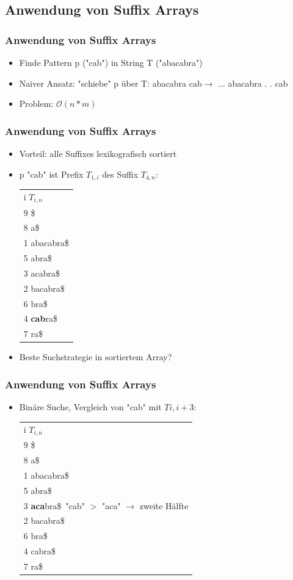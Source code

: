 \documentclass{beamer}
\begin{document}
\subsection{Anwendung von Suffix Arrays}
\begin{frame}
\frametitle{Anwendung von Suffix Arrays}
\begin{itemize}
\item Finde Pattern p ("cab") in String T ("abacabra")
\item Naiver Ansatz: "schiebe" p \"uber T: \newline
abacabra \newline
cab$\rightarrow$ \newline
...\newline
abacabra \newline
. . cab
\item Problem: $\mathcal{O}(n*m)$
\end{itemize}
\end{frame}
\begin{frame}
\frametitle{Anwendung von Suffix Arrays}
\begin{itemize}
\item Vorteil: alle Suffixes lexikografisch sortiert
\item p "cab" ist Prefix $T_{1,i}$ des Suffix $T_{4,n}$: \newline
\begin{tabular}{l}
	i $T_{i,n}$\\
9 \$\\
8 a\$\\
1 abacabra\$\\
5 abra\$\\
3 acabra\$\\
2 bacabra\$\\
6 bra\$\\
4 \color{red}\textbf{cab}\color{black}ra\$\\
7 ra\$\\
	\end{tabular}
\item Beste Suchstrategie in sortiertem Array?
\end{itemize}
\end{frame}
\begin{frame}
\frametitle{Anwendung von Suffix Arrays}
\begin{itemize}
\item Bin\"are Suche, Vergleich von "cab" mit $T{i,i+3}$:\newline
\begin{tabular}{l}
	i $T_{i,n}$\\
9 \$\\
8 a\$\\
1 abacabra\$\\
5 abra\$\\
3 \color{red}\textbf{aca}\color{black}bra\$\ "cab" $>$ "aca" $\rightarrow$ zweite H\"alfte\\
2 bacabra\$\\
6 bra\$\\
4 cabra\$\\
7 ra\$\\
	\end{tabular}
\end{itemize}
\end{frame}
\end{document}
